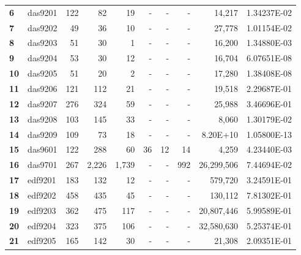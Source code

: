 \begin{longtable}{@{}llrrrrrrrc@{}}
\textbf{6}  & das9201  & 122                  & 82       & 19      & -    & -    & -     & 14,217               & 1.34237E-02 \\
\textbf{7}  & das9202  & 49                   & 36       & 10      & -    & -    & -     & 27,778               & 1.01154E-02 \\
\textbf{8}  & das9203  & 51                   & 30       & 1       & -    & -    & -     & 16,200               & 1.34880E-03 \\
\textbf{9}  & das9204  & 53                   & 30       & 12      & -    & -    & -     & 16,704               & 6.07651E-08 \\
\textbf{10} & das9205  & 51                   & 20       & 2       & -    & -    & -     & 17,280               & 1.38408E-08 \\
\textbf{11} & das9206  & 121                  & 112      & 21      & -    & -    & -     & 19,518               & 2.29687E-01 \\
\textbf{12} & das9207  & 276                  & 324      & 59      & -    & -    & -     & 25,988               & 3.46696E-01 \\
\textbf{13} & das9208  & 103                  & 145      & 33      & -    & -    & -     & 8,060                & 1.30179E-02 \\
\textbf{14} & das9209  & 109                  & 73       & 18      & -    & -    & -     & 8.20E+10             & 1.05800E-13 \\
\textbf{15} & das9601  & 122                  & 288      & 60      & 36   & 12   & 14    & 4,259                & 4.23440E-03 \\
\textbf{16} & das9701  & 267                  & 2,226    & 1,739   & -    & -    & 992   & 26,299,506           & 7.44694E-02 \\
\textbf{17} & edf9201  & 183                  & 132      & 12      & -    & -    & -     & 579,720              & 3.24591E-01 \\
\textbf{18} & edf9202  & 458                  & 435      & 45      & -    & -    & -     & 130,112              & 7.81302E-01 \\
\textbf{19} & edf9203  & 362                  & 475      & 117     & -    & -    & -     & 20,807,446           & 5.99589E-01 \\
\textbf{20} & edf9204  & 323                  & 375      & 106     & -    & -    & -     & 32,580,630           & 5.25374E-01 \\
\textbf{21} & edf9205  & 165                  & 142      & 30      & -    & -    & -     & 21,308               & 2.09351E-01 \\

\end{longtable}
